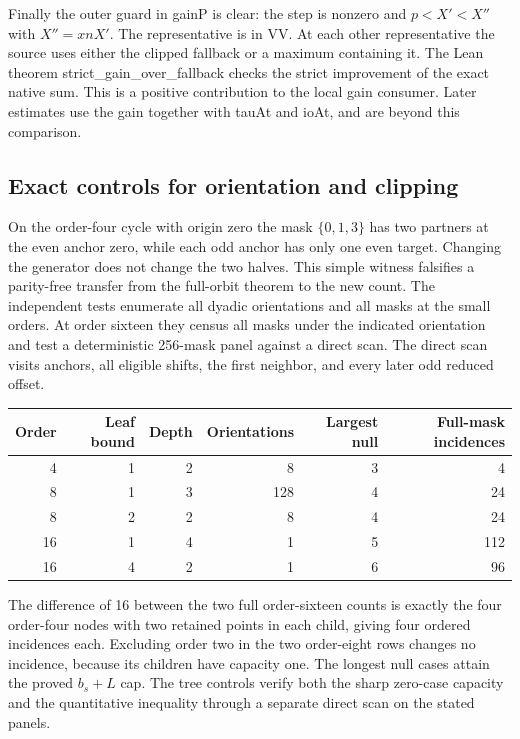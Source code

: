\documentclass[12pt,letterpaper]{article}
\DeclareRobustCommand{\id}[1]{\mbox{\small\ttfamily #1}}
\begin{document}
Finally the outer guard in \id{gainP} is clear: the step is nonzero and \(p<X'<X''\) with \(X''=xnX'\). The representative is in \id{VV}. At each other representative the source uses either the clipped fallback or a maximum containing it. The Lean theorem \id{strict\_gain\_over\_fallback} checks the strict improvement of the exact native sum. This is a positive contribution to the local gain consumer. Later estimates use the gain together with \id{tauAt} and \id{ioAt}, and are beyond this comparison.

\subsection{Exact controls for orientation and clipping}

On the order-four cycle with origin zero the mask \(\{0,1,3\}\) has two partners at the even anchor zero, while each odd anchor has only one even target. Changing the generator does not change the two halves. This simple witness falsifies a parity-free transfer from the full-orbit theorem to the new count. The independent tests enumerate all dyadic orientations and all masks at the small orders. At order sixteen they census all masks under the indicated orientation and test a deterministic 256-mask panel against a direct scan. The direct scan visits anchors, all eligible shifts, the first neighbor, and every later odd reduced offset.
\begin{center}
\begin{tabular}{@{}rrrrrr@{}}
\toprule
Order&Leaf bound&Depth&Orientations&Largest null&Full-mask incidences\\
\midrule
4&1&2&8&3&4\\
8&1&3&128&4&24\\
8&2&2&8&4&24\\
16&1&4&1&5&112\\
16&4&2&1&6&96\\
\bottomrule
\end{tabular}
\end{center}
The difference of 16 between the two full order-sixteen counts is exactly the four order-four nodes with two retained points in each child, giving four ordered incidences each. Excluding order two in the two order-eight rows changes no incidence, because its children have capacity one. The longest null cases attain the proved \(b_s+L\) cap. The tree controls verify both the sharp zero-case capacity and the quantitative inequality through a separate direct scan on the stated panels.
\end{document}
